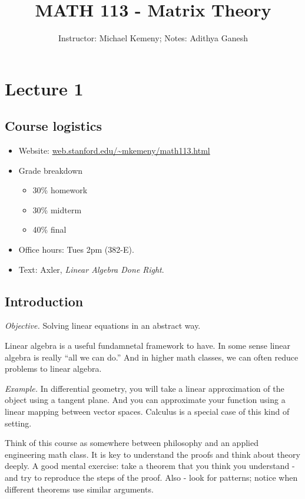\documentclass[12pt]{article}
\title{MATH 113 - Matrix Theory}
\author{Instructor: Michael Kemeny; Notes: Adithya Ganesh}
\begin{document}
\maketitle
\tableofcontents

\section{Lecture 1}

\subsection{Course logistics}

\begin{itemize}
  \item Website: \url{web.stanford.edu/~mkemeny/math113.html}
  \item Grade breakdown
    \begin{itemize}
        \item 30\% homework
        \item 30\% midterm
        \item 40\% final
    \end{itemize}
  \item Office hours: Tues 2pm (382-E).
  \item Text: Axler, {\it Linear Algebra Done Right}.
  \end{itemize}

  \subsection{Introduction}
{\it Objective.} Solving linear equations in an abstract way.

Linear algebra is a useful fundamnetal framework to have.  In some sense linear algebra is really ``all we can do.'' And in higher math classes, we can often reduce problems to linear algebra.  

{\it Example.} In differential geometry, you will take a linear approximation of the object using a tangent plane.  And you can approximate your function using a linear mapping between vector spaces.  Calculus is a special case of this kind of setting.

Think of this course as somewhere between philosophy and an applied engineering math class.  It is key to understand the proofs and think about theory deeply.  A good mental exercise: take a theorem that you think you understand - and try to reproduce the steps of the proof.  Also - look for patterns; notice when different theorems use similar arguments.
\end{document}
